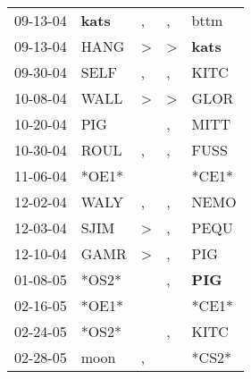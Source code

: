\begin{supertabular}{p{0.07\textwidth}p{0.06\textwidth}p{0.02\textwidth}p{0.02\textwidth}p{0.06\textwidth}}
          09-13-04\textsuperscript{} &  \textbf{kats\textsuperscript{}} &                , &                , &           bttm\textsuperscript{} \\
          09-13-04\textsuperscript{} &           HANG\textsuperscript{} &     \textgreater &     \textgreater &  \textbf{kats\textsuperscript{}} \\
          09-30-04\textsuperscript{} &           SELF\textsuperscript{} &                , &                , &           KITC\textsuperscript{} \\
          10-08-04\textsuperscript{} &           WALL\textsuperscript{} &     \textgreater &     \textgreater &           GLOR\textsuperscript{} \\
          10-20-04\textsuperscript{} &            PIG\textsuperscript{} &                  &                , &           MITT\textsuperscript{} \\
          10-30-04\textsuperscript{} &           ROUL\textsuperscript{} &                , &                , &           FUSS\textsuperscript{} \\
          11-06-04\textsuperscript{} &                            *OE1* &                  &                  &                            *CE1* \\
          12-02-04\textsuperscript{} &           WALY\textsuperscript{} &                , &                , &           NEMO\textsuperscript{} \\
          12-03-04\textsuperscript{} &           SJIM\textsuperscript{} &     \textgreater &                , &           PEQU\textsuperscript{} \\
          12-10-04\textsuperscript{} &           GAMR\textsuperscript{} &     \textgreater &                , &            PIG\textsuperscript{} \\
          01-08-05\textsuperscript{} &                            *OS2* &                  &                , &   \textbf{PIG\textsuperscript{}} \\
          02-16-05\textsuperscript{} &                            *OE1* &                  &                  &                            *CE1* \\
          02-24-05\textsuperscript{} &                            *OS2* &                  &                , &           KITC\textsuperscript{} \\
          02-28-05\textsuperscript{} &           moon\textsuperscript{} &                , &                  &                            *CS2* \\

\end{supertabular}

